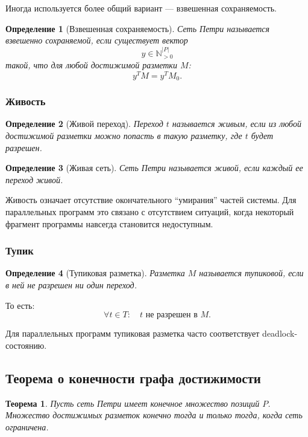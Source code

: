 \documentclass[12pt,a4paper]{article}
\newtheorem{definition}{Определение}
\newtheorem{theorem}{Теорема}
\begin{document}
Иногда используется более общий вариант --- взвешенная сохраняемость.

\begin{definition}[Взвешенная сохраняемость]
Сеть Петри называется взвешенно сохраняемой, если существует вектор
\[
y \in \mathbb{N}_{>0}^{|P|}
\]
такой, что для любой достижимой разметки $M$:
\[
y^T M = y^T M_0.
\]
\end{definition}

\subsubsection{Живость}

\begin{definition}[Живой переход]
Переход $t$ называется живым, если из любой достижимой разметки можно попасть в такую разметку, где $t$ будет разрешен.
\end{definition}

\begin{definition}[Живая сеть]
Сеть Петри называется живой, если каждый ее переход живой.
\end{definition}

Живость означает отсутствие окончательного ``умирания'' частей системы. Для параллельных программ это связано с отсутствием ситуаций, когда некоторый фрагмент программы навсегда становится недоступным.

\subsubsection{Тупик}

\begin{definition}[Тупиковая разметка]
Разметка $M$ называется тупиковой, если в ней не разрешен ни один переход.
\end{definition}

То есть:
\[
\forall t\in T:
\quad t \text{ не разрешен в } M.
\]

Для параллельных программ тупиковая разметка часто соответствует deadlock-состоянию.

\subsection{Теорема о конечности графа достижимости}

\begin{theorem}
Пусть сеть Петри имеет конечное множество позиций $P$. Множество достижимых разметок конечно тогда и только тогда, когда сеть ограничена.
\end{theorem}
\end{document}
